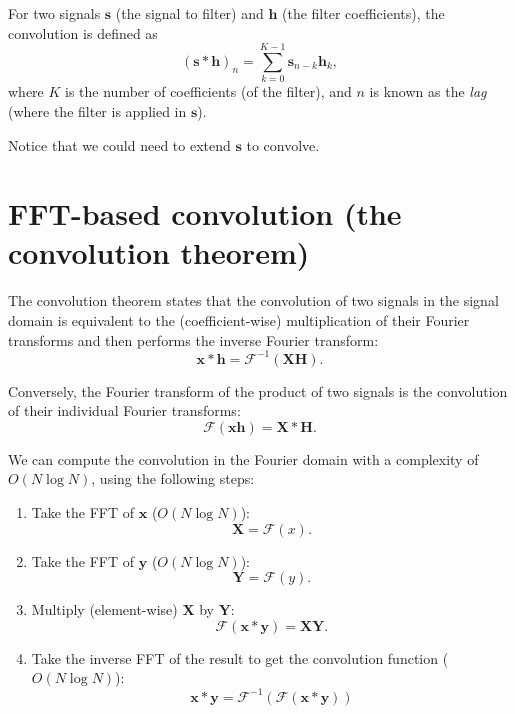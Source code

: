 For two signals $\mathbf{s}$ (the signal to filter) and
$\mathbf{h}$ (the filter coefficients), the convolution is defined as
\begin{equation}
(\mathbf{s}\ast\mathbf{h})_{n}=\sum_{k=0}^{K-1}\mathbf{s}_{n-k}\mathbf{h}_{k},
\label{eq:convolution}
\end{equation}
where $K$ is the number of coefficients (of the filter), and $n$ is known as the \emph{lag} (where the filter is applied in $\mathbf{s}$).

Notice that we could need to extend $\mathbf{s}$ to convolve.


\section{FFT-based convolution (the convolution theorem)}
\label{sec:convolution_theorem}

The convolution theorem states that the convolution of two signals in
the signal domain is equivalent to the (coefficient-wise)
multiplication of their Fourier transforms and then performs the
inverse Fourier transform:
\begin{equation}
  \mathbf{x}\ast\mathbf{h} = \mathcal{F}^{-1}(\mathbf{X}\mathbf{H}).
\end{equation}

Conversely, the Fourier transform of the product of two signals is
the convolution of their individual Fourier transforms:
\begin{equation}
  \mathcal{F}(\mathbf{x}\mathbf{h}) = \mathbf{X}\ast\mathbf{H}.
\end{equation}

We can compute the convolution in the Fourier
domain with a
complexity of $O(N\log N)$, using the following steps:
\begin{enumerate}
\item Take the FFT of $\mathbf{x}$ ($O(N\log N)$):
  \begin{equation}
    \mathbf{X} = \mathcal{F}(x).
  \end{equation}
\item Take the FFT of $\mathbf{y}$ ($O(N\log N)$):
  \begin{equation}
    \mathbf{Y} = \mathcal{F}(y).
  \end{equation}
\item Multiply (element-wise) $\mathbf{X}$ by
  $\mathbf{Y}$:
  \begin{equation}
    \mathcal{F}(\mathbf{x}\ast\mathbf{y})=\mathbf{X}\mathbf{Y}.
  \end{equation}
\item Take the inverse FFT of the result to get the convolution
  function ($O(N\log N)$):
  \begin{equation}
    \mathbf{x}\ast\mathbf{y} = \mathcal{F}^{-1}(\mathcal{F}(\mathbf{x}\ast\mathbf{y}))
  \end{equation}
\end{enumerate}

